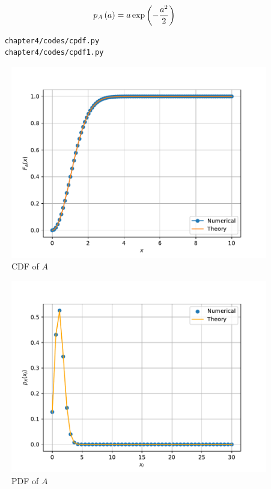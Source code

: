 \begin{enumerate}
\begin{align}
	p_{A}\left(a\right) &= a\exp\left(-\frac{a^2}{2}\right)
\end{align}
\begin{lstlisting}
	chapter4/codes/cpdf.py
	chapter4/codes/cpdf1.py
\end{lstlisting}
\begin{figure}[H]
\centering
\includegraphics[scale = 0.8]{chapter4/figs/rayleigh_cdf.pdf}
\caption{CDF of $A$}
\label{fig:rayleigh_cdf}
\end{figure}
\begin{figure}[H]
\centering
\includegraphics[scale=0.8]{chapter4/figs/rayleigh_pdf.pdf}
\caption{PDF of $A$}
\label{fig:rayleigh_pdf}
\end{figure}
%
\end{enumerate}

